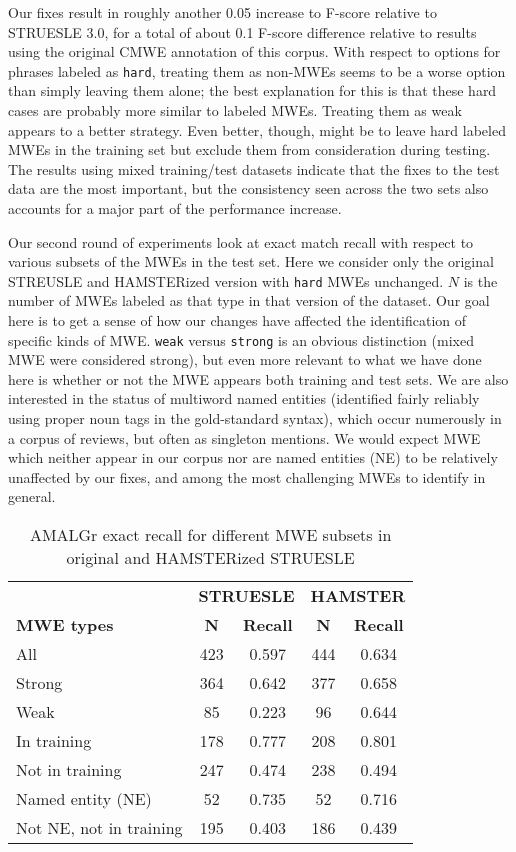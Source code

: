 \documentclass[output=paper
,modfonts
,nonflat]{langsci/langscibook}
\newcommand{\mwetype}[1]{\texttt{#1}\xspace}
\newcommand{\strongish}{\mwetype{strong}}
\newcommand{\weak}{\mwetype{weak}}
\newcommand{\hard}{\mwetype{hard}}
\begin{document}
Our fixes result in roughly another 0.05 increase to F-score relative to STRUESLE 3.0, for a total of about 0.1 F-score difference relative to results using the original CMWE annotation of this corpus. With respect to options for phrases labeled as \hard, treating them as non-MWEs seems to be a worse option than simply leaving them alone; the best explanation for this is that these hard cases are probably more similar to labeled MWEs. Treating them as weak appears to a better strategy. Even better, though, might be to leave hard labeled MWEs in the training set but exclude them from consideration during testing. The results using mixed training/test datasets indicate that the fixes to the test data are the most important, but the consistency seen across the two sets also accounts for a major part of the performance increase.

Our second round of experiments look at exact match recall with respect to various subsets of the MWEs in the test set. Here we consider only the original STREUSLE and HAMSTERized version with \hard MWEs unchanged. $N$ is the number of MWEs labeled as that type in that version of the dataset. Our goal here is to get a sense of how our changes have affected the identification of specific kinds of MWE. \weak versus \strongish is an obvious distinction (mixed MWE were considered strong), but even more relevant to what we have done here is whether or not the MWE appears both training and test sets. We are also interested in the status of multiword named entities (identified fairly reliably using proper noun tags in the gold-standard syntax), which occur numerously in a corpus of reviews, but often as singleton mentions. We would expect MWE which neither appear in our corpus nor are named entities (NE) to be relatively unaffected by our fixes, and among the most challenging MWEs to identify in general.


\begin{table*}[t!]
\begin{tabular}{l c c c c}
\toprule
&\multicolumn{2}{c}{\textbf{STRUESLE}} & \multicolumn{2}{c}{\textbf{HAMSTER}} \\
\textbf{MWE types}& \textbf{N}& \textbf{Recall}& \textbf{N} & \textbf{Recall} \\
\midrule
All & 423 & 0.597 & 444 & 0.634\\
Strong &  364 & 0.642 & 377 & 0.658\\
Weak & 85& 0.223 & 96 & 0.644 \\
In training & 178 & 0.777 & 208 & 0.801 \\ 
Not in training & 247 & 0.474 & 238 & 0.494 \\
Named entity (NE)& 52 & 0.735 & 52 & 0.716 \\
Not NE, not in training & 195& 0.403 & 186& 0.439\\

\bottomrule
\end{tabular}%
\caption{AMALGr exact recall for different MWE subsets in original and HAMSTERized STRUESLE} %
\label{tab:exp2} %
\end{table*}
\end{document}
